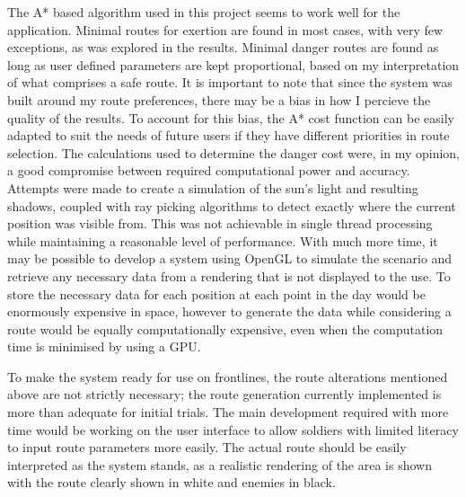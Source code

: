 \documentclass[12pt,a4paper]{article}
\begin{document}
  \par The A* based algorithm used in this project seems to work well for the application. Minimal routes for exertion are found in most cases, with very few exceptions, as was explored in the results. Minimal danger routes are found as long as user defined parameters are kept proportional, based on my interpretation of what comprises a safe route. It is important to note that since the system was built around my route preferences, there may be a bias in how I percieve the quality of the results. To account for this bias, the A* cost function can be easily adapted to suit the needs of future users if they have different priorities in route selection. The calculations used to determine the danger cost were, in my opinion, a good compromise between required computational power and accuracy. Attempts were made to create a simulation of the sun's light and resulting shadows, coupled with ray picking algorithms to detect exactly where the current position was visible from. This was not achievable in single thread processing while maintaining a reasonable level of performance. With much more time, it may be possible to develop a system using OpenGL to simulate the scenario and retrieve any necessary data from a rendering that is not displayed to the use. To store the necessary data for each position at each point in the day would be enormously expensive in space, however to generate the data while considering a route would be equally computationally expensive, even when the computation time is minimised by using a GPU.
  \par To make the system ready for use on frontlines, the route alterations mentioned above are not strictly necessary; the route generation currently implemented is more than adequate for initial trials. The main development required with more time would be working on the user interface to allow soldiers with limited literacy to input route parameters more easily. The actual route should be easily interpreted as the system stands, as a realistic rendering of the area is shown with the route clearly shown in white and enemies in black.
\end{document}
